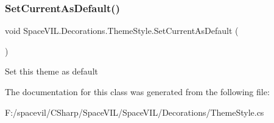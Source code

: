\subsubsection{\texorpdfstring{Set\+Current\+As\+Default()}{SetCurrentAsDefault()}}
{\footnotesize\ttfamily void Space\+V\+I\+L.\+Decorations.\+Theme\+Style.\+Set\+Current\+As\+Default (\begin{DoxyParamCaption}{ }\end{DoxyParamCaption})\hspace{0.3cm}{\ttfamily [inline]}}



Set this theme as default 



The documentation for this class was generated from the following file\+:\begin{DoxyCompactItemize}
\item 
F\+:/spacevil/\+C\+Sharp/\+Space\+V\+I\+L/\+Space\+V\+I\+L/\+Decorations/Theme\+Style.\+cs\end{DoxyCompactItemize}
